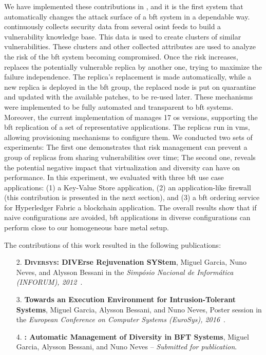We have implemented these contributions in \system, and it is the first system that automatically changes the attack surface of a \gls{bft} system in a dependable way.
\system continuously collects security data from several \gls{osint} feeds to build a vulnerability knowledge base.
This data is used to create clusters of similar vulnerabilities.
These clusters and other collected attributes are used to analyze the risk of the \gls{bft} system becoming compromised. 
Once the risk increases, \system replaces the potentially vulnerable replica by another one, trying to maximize the failure independence. 
The replica's replacement is made automatically, while a new replica is deployed in the \gls{bft} group, the replaced node is put on quarantine and updated with the available patches, to be re-used later.
These mechanisms were implemented to be fully automated and transparent to \gls{bft} systems.
Moreover, the current implementation of \system manages 17 \gls{os} versions, supporting the \gls{bft} replication of a set of representative applications.
The replicas run in \glspl{vm}, allowing provisioning mechanisms to configure them. 
We conducted two sets of experiments: The first one demonstrates that \system risk management can prevent a group of replicas from sharing vulnerabilities over time; 
The second one, reveals the potential negative impact that virtualization and diversity can have on performance. 
In this experiment, we evaluated \system with three \gls{bft} use case applications: (1) a Key-Value Store application, (2) \sieveq an application-like firewall (this contribution is presented in the next section), and (3) a \gls{bft} ordering service for Hyperledger Fabric a blockchain application.
The overall results show that if naive configurations are avoided, \gls{bft} applications in diverse configurations can perform close to our homogeneous bare metal setup.

The contributions of this work resulted in the following publications:

\begin{enumerate}

\item[2.] \textbf{\textsc{Diversys}: DIVErse Rejuvenation SYStem}, Miguel Garcia, Nuno Neves, and  Alysson Bessani in the \emph{Simp\'{o}sio Nacional de Inform\'{a}tica (INFORUM), 2012~\cite{Garcia:2012b}}.


\item[3.] \textbf{Towards an Execution Environment for Intrusion-Tolerant Systems}, Miguel Garcia, Alysson Bessani, and Nuno Neves, Poster session in the \emph{European Conference on Computer Systems (EuroSys), 2016}~\cite{Garcia:2016b}.


\item[4.] \textbf{\system: Automatic Management of Diversity in BFT Systems}, Miguel Garcia, Alysson Bessani, and Nuno Neves -- \emph{Submitted for publication}.

\end{enumerate}


